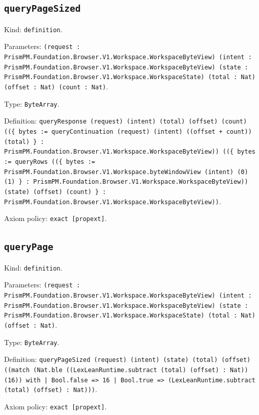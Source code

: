 \documentclass[11pt]{article}
\begin{document}
\subsection*{\texttt{queryPageSized}}
\noindent Kind: \texttt{definition}.\par
\noindent Parameters: \texttt{(request : PrismPM.Foundation.Browser.V1.Workspace.WorkspaceByteView) (intent : PrismPM.Foundation.Browser.V1.Workspace.WorkspaceByteView) (state : PrismPM.Foundation.Browser.V1.Workspace.WorkspaceState) (total : Nat) (offset : Nat) (count : Nat)}.\par
\noindent Type: \texttt{ByteArray}.\par
\noindent Definition: \texttt{queryResponse (request) (intent) (total) (offset) (count) ((\{ bytes := queryContinuation (request) (intent) ((offset + count)) (total) \} : PrismPM.Foundation.Browser.V1.Workspace.WorkspaceByteView)) ((\{ bytes := queryRows ((\{ bytes := PrismPM.Foundation.Browser.V1.Workspace.byteWindowView (intent) (0) (1) \} : PrismPM.Foundation.Browser.V1.Workspace.WorkspaceByteView)) (state) (offset) (count) \} : PrismPM.Foundation.Browser.V1.Workspace.WorkspaceByteView))}.\par
\noindent Axiom policy: \texttt{exact [propext]}.\par
\subsection*{\texttt{queryPage}}
\noindent Kind: \texttt{definition}.\par
\noindent Parameters: \texttt{(request : PrismPM.Foundation.Browser.V1.Workspace.WorkspaceByteView) (intent : PrismPM.Foundation.Browser.V1.Workspace.WorkspaceByteView) (state : PrismPM.Foundation.Browser.V1.Workspace.WorkspaceState) (total : Nat) (offset : Nat)}.\par
\noindent Type: \texttt{ByteArray}.\par
\noindent Definition: \texttt{queryPageSized (request) (intent) (state) (total) (offset) ((match (Nat.ble ((LexLeanRuntime.subtract (total) (offset) : Nat)) (16)) with | Bool.false => 16 | Bool.true => (LexLeanRuntime.subtract (total) (offset) : Nat)))}.\par
\noindent Axiom policy: \texttt{exact [propext]}.\par
\end{document}
